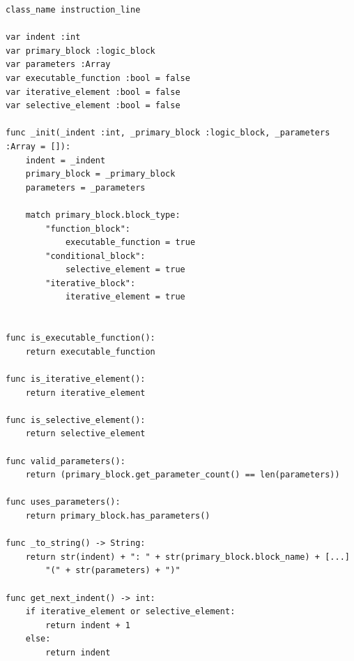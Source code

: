 \begin{fullwidthfigure}
    \centering
    \begin{tcolorbox}[boxrule=0.25mm]
    \begin{verbatim}
class_name instruction_line

var indent :int
var primary_block :logic_block
var parameters :Array
var executable_function :bool = false
var iterative_element :bool = false
var selective_element :bool = false

func _init(_indent :int, _primary_block :logic_block, _parameters :Array = []):
    indent = _indent
    primary_block = _primary_block
    parameters = _parameters

    match primary_block.block_type:
        "function_block":
            executable_function = true
        "conditional_block":
            selective_element = true
        "iterative_block":
            iterative_element = true


func is_executable_function():
    return executable_function

func is_iterative_element():
    return iterative_element

func is_selective_element():
    return selective_element

func valid_parameters():
    return (primary_block.get_parameter_count() == len(parameters))

func uses_parameters():
    return primary_block.has_parameters()

func _to_string() -> String:
    return str(indent) + ": " + str(primary_block.block_name) + [...]
        "(" + str(parameters) + ")"

func get_next_indent() -> int:
    if iterative_element or selective_element:
        return indent + 1
    else:
        return indent
    \end{verbatim}
    \end{tcolorbox}
    \caption{Instruction class definition}
    \label{fig:design/CatCodeBack/instructionLineFull}
\end{fullwidthfigure}

